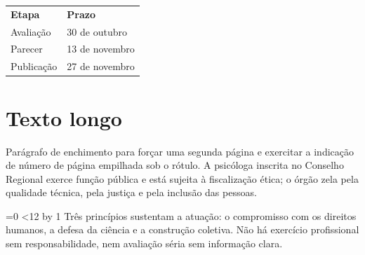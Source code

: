 \documentclass{crpsp-timbrado}
\begin{document}
\begin{tabular}{@{}ll@{}}
  \textbf{Etapa}  & \textbf{Prazo}    \\
  Avaliação       & 30 de outubro     \\
  Parecer         & 13 de novembro    \\
  Publicação      & 27 de novembro    \\
\end{tabular}

\section{Texto longo}

Parágrafo de enchimento para forçar uma segunda página e exercitar a indicação
de número de página empilhada sob o rótulo. A psicóloga inscrita no Conselho
Regional exerce função pública e está sujeita à fiscalização ética; o órgão
zela pela qualidade técnica, pela justiça e pela inclusão das pessoas.

=0
\loop\ifnum{}<12
  \advance{} by 1
  Três princípios sustentam a atuação: o compromisso com os direitos humanos, a
  defesa da ciência e a construção coletiva. Não há exercício profissional sem
  responsabilidade, nem avaliação séria sem informação clara.\par
\repeat
\end{document}
